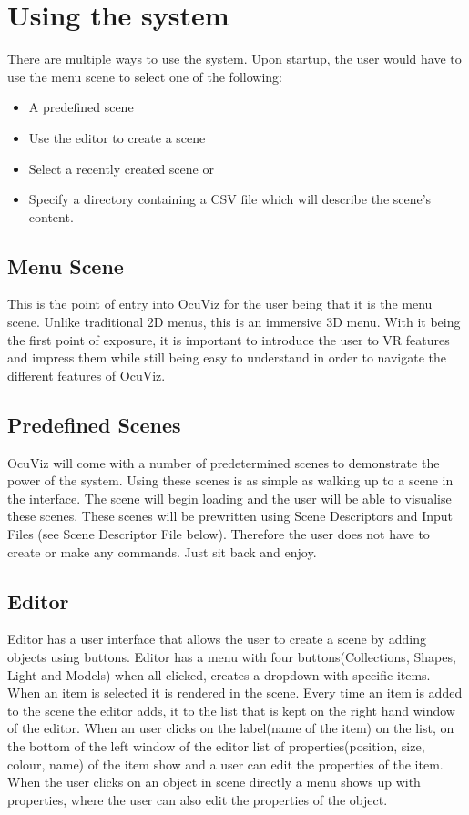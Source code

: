 \documentclass[a4paper,12pt]{article}
\begin{document}
\section{Using the system}

There are multiple ways to use the system. Upon startup, the user would have to use the menu scene to select one of the following:

\begin{itemize}
\item A predefined scene
\item Use the editor to create a scene
\item Select a recently created scene or
\item Specify a directory containing a CSV file which will describe the scene's content.
\end{itemize}

\subsection{Menu Scene}
This is the point of entry into OcuViz for the user being that it is the menu scene. Unlike traditional 2D menus, this is an immersive 3D menu. With it being the first point of exposure, it is important to introduce the user to VR features and impress them while still being easy to understand in order to navigate the different features of OcuViz.

\subsection{Predefined Scenes}
OcuViz will come with a number of predetermined scenes to demonstrate the power of the system. Using these scenes is as simple as walking up to a scene in the interface. The scene will begin loading and the user will be able to visualise these scenes. These scenes will be prewritten using Scene Descriptors and Input Files (see Scene Descriptor File below). Therefore the user does not have to create or make any commands. Just sit back and enjoy.

\subsection{Editor}
Editor has a user interface that allows the user to create a scene by adding objects using buttons. Editor has a menu with four buttons(Collections, Shapes, Light and Models) when all clicked, creates a dropdown with specific items. 
When an item is selected it is rendered in the scene. Every time an item is added to the scene the editor adds, it to the list that is kept on the right hand window of the editor.
 When an user clicks on the label(name of the item) on the list, on the bottom of the left window of the editor list of properties(position, size, colour, name) of the item show and a user can edit the properties of the item. 
When the user clicks on an object in scene directly a menu shows up with properties, where the user can also edit the properties of the object.
\end{document}

